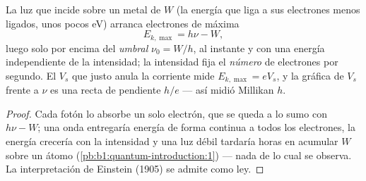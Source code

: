 \begin{proposition}\label{prop:b1:quantum-introduction:photoelectric}
La luz que incide sobre un metal de \emph{} $W$ (la
energía que liga a sus electrones menos ligados, unos pocos eV) arranca
electrones de  máxima
\[
E_{k,\max} = h\nu - W ,
\]
luego solo por encima del \emph{umbral} $\nu_0 = W/h$, al instante y con
una energía independiente de la intensidad; la intensidad fija el
\emph{número} de electrones por segundo. El \emph{}
$V_s$ que justo anula la corriente mide $E_{k,\max} = eV_s$, y la gráfica
de $V_s$ frente a $\nu$ es una recta de pendiente $h/e$ --- así midió
Millikan $h$.
\end{proposition}

\begin{proof}
Cada fotón lo absorbe un solo electrón, que se queda a lo sumo con
$h\nu - W$; una onda entregaría energía de forma continua a todos los
electrones, la energía crecería con la intensidad y una luz débil
tardaría horas en acumular $W$ sobre un átomo
(\cref{pb:b1:quantum-introduction:1}) --- nada de lo cual se observa. La
interpretación de Einstein (1905) se admite como ley.
\end{proof}

